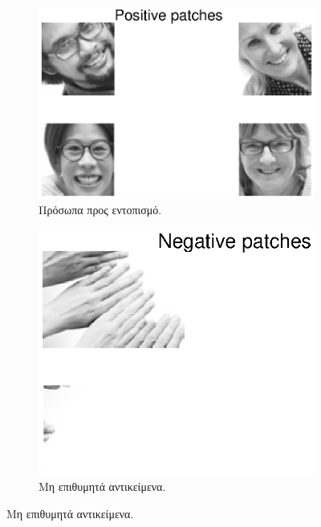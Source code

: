 \documentclass{article}
\begin{document}
	\begin{figure}[H]		
		\begin{subfigure}[b]{0.5\textwidth}
			\includegraphics[width=\textwidth]{res/pos_patches.eps}
			\caption{Πρόσωπα προς εντοπισμό.}
			\label{fig:i}		
		\end{subfigure}%
		\begin{subfigure}[b]{0.5\textwidth}
			\includegraphics[width=\textwidth]{res/neg_patches.eps}
			\caption{Μη επιθυμητά αντικείμενα.}
		\end{subfigure}%
		

\end{figure}
\end{document}
